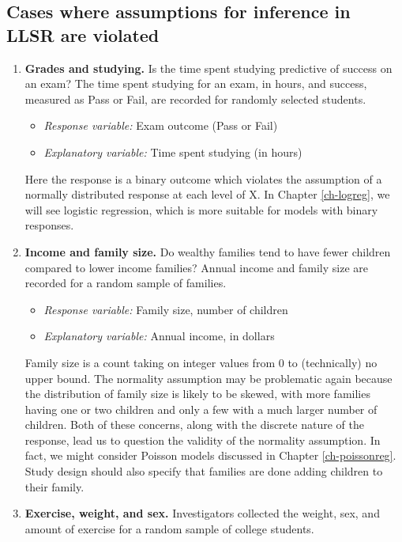 \documentclass[
]{krantz}
\providecommand{\tightlist}{%
  \setlength{\itemsep}{0pt}\setlength{\parskip}{0pt}}
\begin{document}
\hypertarget{cases-where-assumptions-for-inference-in-llsr-are-violated}{%
\subsection{Cases where assumptions for inference in LLSR are violated}\label{cases-where-assumptions-for-inference-in-llsr-are-violated}}

\begin{enumerate}
\def\labelenumi{\arabic{enumi})}
\item
  \textbf{Grades and studying.} Is the time spent studying predictive of success on an exam? The time spent studying for an exam, in hours, and success, measured as Pass or Fail, are recorded for randomly selected students.

  \begin{itemize}
  \tightlist
  \item
    \emph{Response variable:} Exam outcome (Pass or Fail)
  \item
    \emph{Explanatory variable:} Time spent studying (in hours)
  \end{itemize}

  Here the response is a binary outcome which violates the assumption of a normally distributed response at each level of X. In Chapter \ref{ch-logreg}, we will see logistic regression, which is more suitable for models with binary responses.
\item
  \textbf{Income and family size.} Do wealthy families tend to have fewer children compared to lower income families? Annual income and family size are recorded for a random sample of families.

  \begin{itemize}
  \tightlist
  \item
    \emph{Response variable:} Family size, number of children
  \item
    \emph{Explanatory variable:} Annual income, in dollars
  \end{itemize}

  Family size is a count taking on integer values from 0 to (technically) no upper bound. The normality assumption may be problematic again because the distribution of family size is likely to be skewed, with more families having one or two children and only a few with a much larger number of children. Both of these concerns, along with the discrete nature of the response, lead us to question the validity of the normality assumption. In fact, we might consider Poisson models discussed in Chapter \ref{ch-poissonreg}. Study design should also specify that families are done adding children to their family.
\item
  \textbf{Exercise, weight, and sex.} Investigators collected the weight, sex, and amount of exercise for a random sample of college students.


\end{enumerate}
\end{document}
